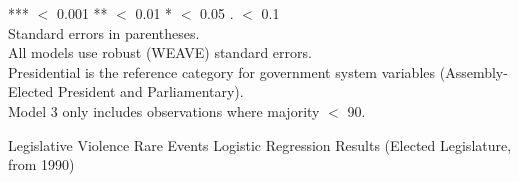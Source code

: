 \documentclass[a4paper]{article}\usepackage{graphicx, color}
\begin{document}
\begin{landscape}
\begin{table}
{{}}
{\scriptsize{
	{*}{*}{*} $<$ 0.001 {*}{*} $<$ 0.01 {*} $<$ 0.05 {.} $<$ 0.1 \\
	Standard errors in parentheses. \\
	All models use robust (WEAVE) standard errors. \\
    Presidential is the reference category for government system variables (Assembly-Elected President and Parliamentary). \\
    Model 3 only includes observations where majority $<$ 90.
}}
\end{table}
\end{landscape}

\begin{landscape}
\begin{table}
\caption{Legislative Violence Rare Events Logistic Regression Results (Elected Legislature, from 1990)}
\label{outputTable.demNew}
{\tiny{

}}
\end{table}
\end{landscape}
\end{document}
